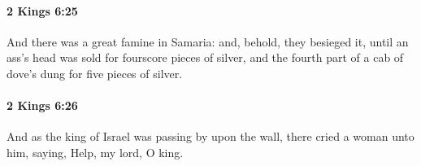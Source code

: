 		\paragraph{2 Kings 6:25} %
			\label{2KINGS-6-25}

			And there was a great famine in Samaria: and, behold, they besieged it, until an ass’s head was sold for fourscore pieces of silver, and the fourth part of a cab of dove’s dung for five pieces of silver.


		\paragraph{2 Kings 6:26} %
			\label{2KINGS-6-26}

			And as the king of Israel was passing by upon the wall, there cried a woman unto him, saying, Help, my lord, O king.


